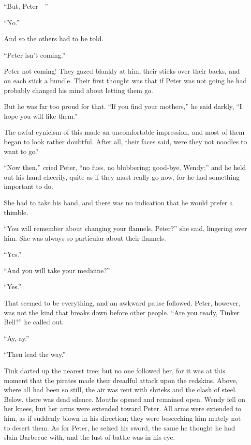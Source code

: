 ``But, Peter---''

``No.''

And so the others had to be told.

``Peter isn't coming.''

Peter not coming! They gazed blankly at him, their sticks over their
backs, and on each stick a bundle. Their first thought was that if
Peter was not going he had probably changed his mind about letting them
go.

But he was far too proud for that. ``If you find your mothers,'' he said
darkly, ``I hope you will like them.''

The awful cynicism of this made an uncomfortable impression, and most
of them began to look rather doubtful. After all, their faces said,
were they not noodles to want to go?

``Now then,'' cried Peter, ``no fuss, no blubbering; good-bye, Wendy;'' and
he held out his hand cheerily, quite as if they must really go now, for
he had something important to do.

She had to take his hand, and there was no indication that he would
prefer a thimble.

``You will remember about changing your flannels, Peter?'' she said,
lingering over him. She was always so particular about their flannels.

``Yes.''

``And you will take your medicine?''

``Yes.''

That seemed to be everything, and an awkward pause followed. Peter,
however, was not the kind that breaks down before other people. ``Are
you ready, Tinker Bell?'' he called out.

``Ay, ay.''

``Then lead the way.''

Tink darted up the nearest tree; but no one followed her, for it was at
this moment that the pirates made their dreadful attack upon the
redskins. Above, where all had been so still, the air was rent with
shrieks and the clash of steel. Below, there was dead silence. Mouths
opened and remained open. Wendy fell on her knees, but her arms were
extended toward Peter. All arms were extended to him, as if suddenly
blown in his direction; they were beseeching him mutely not to desert
them. As for Peter, he seized his sword, the same he thought he had
slain Barbecue with, and the lust of battle was in his eye.
